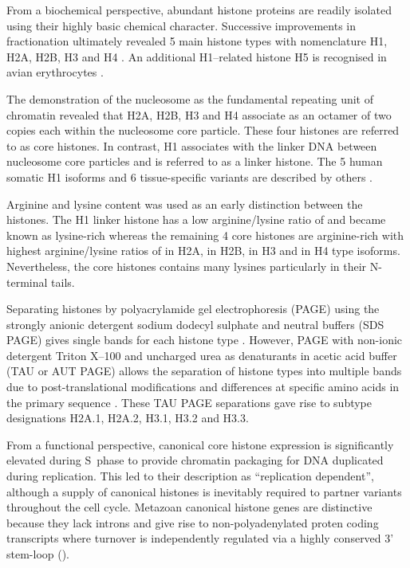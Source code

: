 	From a biochemical perspective, abundant histone proteins 
	are readily isolated using their highly basic chemical character. 
	Successive improvements in fractionation ultimately revealed 5 main histone types 
	with nomenclature H1, H2A, H2B, H3 and H4 \citep{nomenclature}.
	An additional H1--related histone H5 is recognised in avian erythrocytes \citep{HFive-review}.

	The demonstration of the nucleosome as the fundamental repeating unit of chromatin \citep{Kornberg1974} 
	revealed that H2A, H2B, H3 and H4 associate as an octamer of two copies each within the
	nucleosome core particle. These four histones are referred to as core histones. 
	In contrast, H1 associates with the linker DNA between nucleosome core particles 
	and is referred to as a linker histone. 
	The 5 human somatic H1 isoforms and 6 tissue-specific variants are described by others \citep{HarshmanFreitas2013}.

	Arginine and lysine content was used as an early distinction between the histones. 
	The H1 linker histone has a low arginine/lysine ratio of \LinkerArgLysRatio{} and became known as lysine-rich 
	whereas the remaining 4 core histones are arginine-rich 
	with highest arginine/lysine ratios of \HTwoAArgLysRatio{} in H2A, \HTwoBArgLysRatio{} in H2B, 
	\HThreeArgLysRatio{} in H3 and \HFourArgLysRatio{} in H4 type isoforms.
	Nevertheless, the core histones contains many lysines particularly in their N-terminal tails.

	Separating histones by polyacrylamide gel electrophoresis (PAGE) 
	using the strongly anionic detergent sodium dodecyl sulphate and neutral buffers (SDS PAGE) 
	gives single bands for each histone type \citep{ShechterHake2007}. 
	However, PAGE with non-ionic detergent Triton X--100 and uncharged urea as denaturants
	in acetic acid buffer (TAU or AUT PAGE) allows the separation of histone types into multiple bands 
	due to post-translational modifications and differences at specific amino acids 
	in the primary sequence \citep{PAGEND}. 
	These TAU PAGE separations gave rise to subtype designations H2A.1, H2A.2, H3.1, H3.2 and H3.3. 

	From a functional perspective, canonical core histone expression
	is significantly elevated during S~phase to provide chromatin packaging 
	for DNA duplicated during replication.
	This led to their description as ``replication dependent'', 
	although a supply of canonical histones is inevitably required 
	to partner variants throughout the cell cycle. 
	Metazoan canonical histone genes are distinctive 
	because they lack introns and give rise to non-polyadenylated proten coding transcripts 
	where turnover is independently regulated via a highly conserved 3' stem-loop ().

